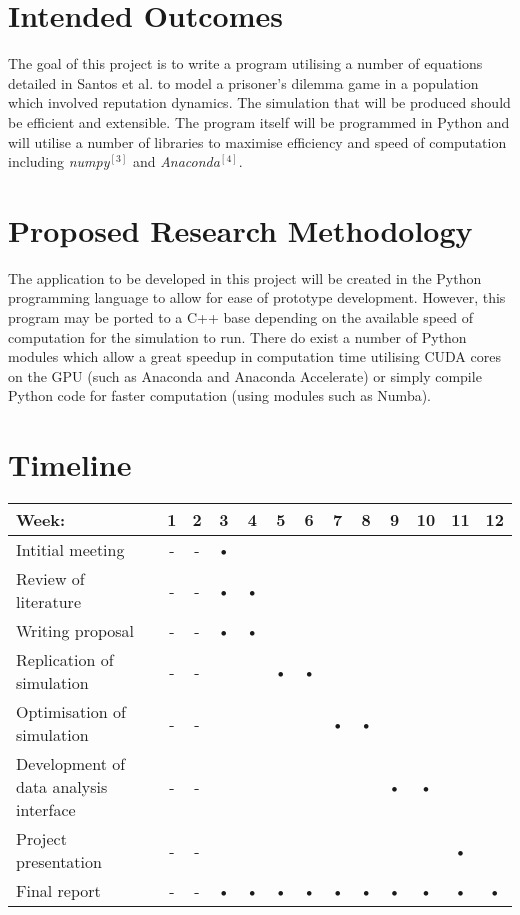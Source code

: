 \documentclass[10pt,a4paper]{article}
\begin{document}
\section{Intended Outcomes}
The goal of this project is to write a program utilising a number of equations detailed in Santos et al. to model a prisoner’s dilemma game in a population which involved reputation dynamics. The simulation that will be produced should be efficient and extensible. The program itself will be programmed in Python and will utilise a number of libraries to maximise efficiency and speed of computation including \textit{numpy}$^{[3]}$ and \textit{Anaconda}$^{[4]}$. 
\section{Proposed Research Methodology}
The application to be developed in this project will be created in the Python programming language to allow for ease of prototype development. However, this program may be ported to a C++ base depending on the available speed of computation for the simulation to run.
There do exist a number of Python modules which allow a great speedup in computation time utilising CUDA cores on the GPU (such as Anaconda and Anaconda Accelerate) or simply compile Python code for faster computation (using modules such as Numba).
\section{Timeline}
\begin{tabular}{|l|c|c|c|c|c|c|c|c|c|c|c|c|}
\hline 
Week: & 1 & 2 & 3 & 4 & 5 & 6 & 7 & 8 & 9 & 10 & 11 & 12 \\ 
\hline 
Intitial meeting & - & - & • &  &  &  &  &  &  &  &  &  \\ 
\hline 
Review of literature & - & - & • & • &  &  &  &  &  &  &  &  \\ 
\hline 
Writing proposal & - & - & • & • &  &  &  &  &  &  &  &  \\ 
\hline 
Replication of simulation & - & - &  &  & • & • &  &  &  &  &  &  \\ 
\hline 
Optimisation of simulation & - & - &  &  &  &  & • & • &  &  &  &  \\ 
\hline 
Development of data analysis interface & - & - &  &  &  &  &  &  & • & • &  &  \\ 
\hline 
Project presentation & - & - &  &  &  &  &  &  &  &  & • &  \\ 
\hline 
Final report & - & - & • & • & • & • & • & • & • & • & • & • \\ 
\hline 
\end{tabular}
\pagebreak  
\end{document}
